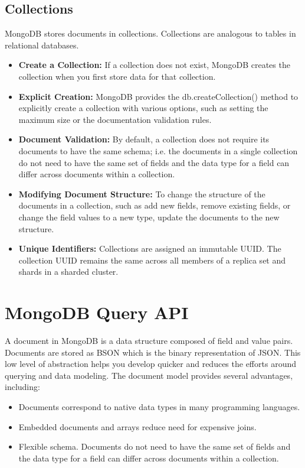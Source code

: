 \subsection{Collections}
MongoDB stores documents in collections. Collections are analogous to tables in relational databases.
\begin{itemize}
    \item \textbf{Create a Collection:} If a collection does not exist, MongoDB creates the collection when you first store data for that collection.
    \item \textbf{Explicit Creation:} MongoDB provides the db.createCollection() method to explicitly create a collection with various options, such as setting the maximum size or the documentation validation rules.
    \item \textbf{Document Validation:} By default, a collection does not require its documents to have the same schema; i.e. the documents in a single collection do not need to have the same set of fields and the data type for a field can differ across documents within a collection.
    \item \textbf{Modifying Document Structure:} To change the structure of the documents in a collection, such as add new fields, remove existing fields, or change the field values to a new type, update the documents to the new structure.
    \item \textbf{Unique Identifiers:} Collections are assigned an immutable UUID. The collection UUID remains the same across all members of a replica set and shards in a sharded cluster.
\end{itemize}

\section{MongoDB Query API}
A document in MongoDB is a data structure composed of field and value pairs. Documents are stored as BSON which is the binary representation of JSON. This low level of abstraction helps you develop quicker and reduces the efforts around querying and data modeling. The document model provides several advantages, including:
\begin{itemize}
    \item Documents correspond to native data types in many programming languages.
    \item Embedded documents and arrays reduce need for expensive joins.
    \item Flexible schema. Documents do not need to have the same set of fields and the data type for a field can differ across documents within a collection.
\end{itemize}

